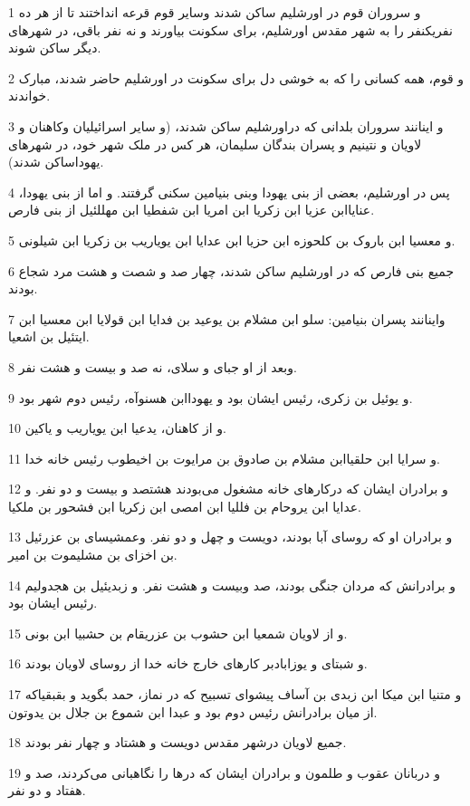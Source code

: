 \par 1 و سروران قوم در اورشلیم ساکن شدند وسایر قوم قرعه انداختند تا از هر ده نفریکنفر را به شهر مقدس اورشلیم، برای سکونت بیاورند و نه نفر باقی، در شهرهای دیگر ساکن شوند.
\par 2 و قوم، همه کسانی را که به خوشی دل برای سکونت در اورشلیم حاضر شدند، مبارک خواندند.
\par 3 و اینانند سروران بلدانی که دراورشلیم ساکن شدند، (و سایر اسرائیلیان وکاهنان و لاویان و نتینیم و پسران بندگان سلیمان، هر کس در ملک شهر خود، در شهرهای یهوداساکن شدند).
\par 4 پس در اورشلیم، بعضی از بنی یهودا وبنی بنیامین سکنی گرفتند. و اما از بنی یهودا، عنایاابن عزیا ابن زکریا ابن امریا ابن شفطیا ابن مهللئیل از بنی فارص.
\par 5 و معسیا ابن باروک بن کلحوزه ابن حزیا ابن عدایا ابن یویاریب بن زکریا ابن شیلونی.
\par 6 جمیع بنی فارص که در اورشلیم ساکن شدند، چهار صد و شصت و هشت مرد شجاع بودند.
\par 7 واینانند پسران بنیامین: سلو ابن مشلام بن یوعید بن فدایا ابن قولایا ابن معسیا ابن ایتئیل بن اشعیا.
\par 8 وبعد از او جبای و سلای، نه صد و بیست و هشت نفر.
\par 9 و یوئیل بن زکری، رئیس ایشان بود و یهوداابن هسنوآه، رئیس دوم شهر بود.
\par 10 و از کاهنان، یدعیا ابن یویاریب و یاکین.
\par 11 و سرایا ابن حلقیاابن مشلام بن صادوق بن مرایوت بن اخیطوب رئیس خانه خدا.
\par 12 و برادران ایشان که درکارهای خانه مشغول می‌بودند هشتصد و بیست و دو نفر. و عدایا ابن یروحام بن فللیا ابن امصی ابن زکریا ابن فشحور بن ملکیا.
\par 13 و برادران او که روسای آبا بودند، دویست و چهل و دو نفر. وعمشیسای بن عزرئیل بن اخزای بن مشلیموت بن امیر.
\par 14 و برادرانش که مردان جنگی بودند، صد وبیست و هشت نفر. و زبدیئیل بن هجدولیم رئیس ایشان بود.
\par 15 و از لاویان شمعیا ابن حشوب بن عزریقام بن حشبیا ابن بونی.
\par 16 و شبتای و یوزابادبر کارهای خارج خانه خدا از روسای لاویان بودند.
\par 17 و متنیا ابن میکا ابن زبدی بن آساف پیشوای تسبیح که در نماز، حمد بگوید و بقبقیاکه از میان برادرانش رئیس دوم بود و عبدا ابن شموع بن جلال بن یدوتون.
\par 18 جمیع لاویان درشهر مقدس دویست و هشتاد و چهار نفر بودند.
\par 19 و دربانان عقوب و طلمون و برادران ایشان که درها را نگاهبانی می‌کردند، صد و هفتاد و دو نفر.
